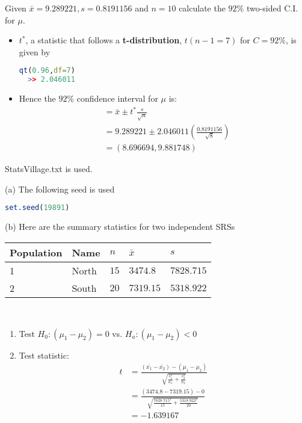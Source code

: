 \documentclass[boxes, qed]{homework}
\begin{document}
\begin{problem}Given $\bar{x}=9.289221, s=0.8191156$ and $n=10$
  calculate the $92\%$ two-sided C.I. for $\mu$.
\end{problem}
\begin{solution}\begin{itemize}
  \item $t^*$, a statistic that follows a \textbf{t-distribution}, $t(n-1=7)$ 
  for $C=92\%$, is given by
  \begin{lstlisting}[backgroundcolor = \color{lightgray},language = R]
  qt(0.96,df=7)
  >> 2.046011
  \end{lstlisting}
  \item Hence the $92\%$ confidence interval for $\mu$ is:
    \begin{align*}
      &= \bar{x} \pm t^*\frac{s}{\sqrt{n}}\\
      &= 9.289221 \pm 2.046011 (\frac{0.8191156}{\sqrt{8}})\\
      &= ( 8.696694, 9.881748)
    \end{align*}
\end{itemize}
\end{solution}

\begin{problem}StatsVillage.txt is used.
\end{problem}
\begin{solution}
  (a) The following seed is used
  \begin{lstlisting}[backgroundcolor = \color{lightgray},language = R]
    set.seed(19891)
  \end{lstlisting}

  (b) Here are the summary statistics for two independent SRSs\\

  \begin{tabular}{l|l|l|l|l}
    \hline
    Population & Name & $n$ & $\bar{x}$ & $s$ \\
    \hline
    1 & North & $15$ & $3474.8$ & $7828.715$ \\
    2 & South & $20$ & $7319.15$ & $5318.922$ \\
  \end{tabular}\\

  \begin{enumerate}
    \item Test $H_0:(\mu_1-\mu_2)=0$ vs. $H_a:(\mu_1-\mu_2)<0$
    \item Test statistic: 
      \begin{align*}
        t
        &=
        \frac{(\bar{x_1}-\bar{x_2}) - (\mu_1-\mu_2)}
        {\sqrt{
          \frac{s_1^2}{n_1}
          +\frac{s_2^2}{n_2}
        }}\\
        &=
        \frac{(3474.8-7319.15) - 0}
        {\sqrt{
          \frac{7828.715^2}{15}
          +\frac{5318.922^2}{20}
        }}\\
        &=-1.639167
      \end{align*}
  \end{enumerate}
\end{solution}
\end{document}
